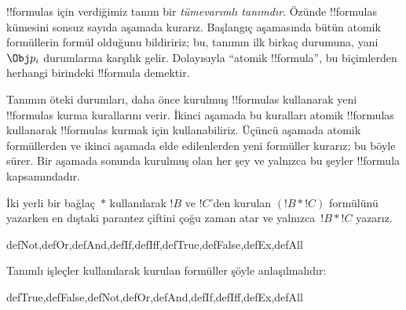 \begin{explain}
!!{formula}s için verdiğimiz tanım bir
\emph{tümevarımlı tanımdır}. Özünde !!{formula}s kümesini sonsuz sayıda
aşamada kurarız. Başlangıç aşamasında bütün atomik formüllerin formül
olduğunu bildiririz; bu, tanımın ilk birkaç durumuna, yani
%
%
$\Obj p_i$ durumlarına karşılık gelir. Dolayısıyla ``atomik !!{formula}'',
bu biçimlerden herhangi birindeki !!{formula} demektir.

Tanımın öteki durumları, daha önce kurulmuş !!{formula}s kullanarak yeni
!!{formula}s kurma kurallarını verir. İkinci aşamada bu kuralları atomik
!!{formula}s kullanarak !!{formula}s kurmak için kullanabiliriz. Üçüncü aşamada
atomik formüllerden ve ikinci aşamada elde edilenlerden yeni formüller
kurarız; bu böyle sürer. Bir aşamada sonunda kurulmuş olan her şey ve yalnızca
bu şeyler !!{formula} kapsamındadır.
\end{explain}

İki yerli bir bağlaç~$\ast$ kullanılarak $!B$ ve $!C$'den kurulan
$(!B \ast !C)$ formülünü yazarken en dıştaki parantez çiftini çoğu zaman
atar ve yalnızca~$!B \ast !C$ yazarız.

\begin{tagblock}{defNot,defOr,defAnd,defIf,defIff,defTrue,defFalse,defEx,defAll}
\begin{defn}
Tanımlı işleçler kullanılarak kurulan formüller şöyle anlaşılmalıdır:

\begin{tagenumerate}{defTrue,defFalse,defNot,defOr,defAnd,defIf,defIff,defEx,defAll}







\end{tagenumerate}
\end{defn}
\end{tagblock}

